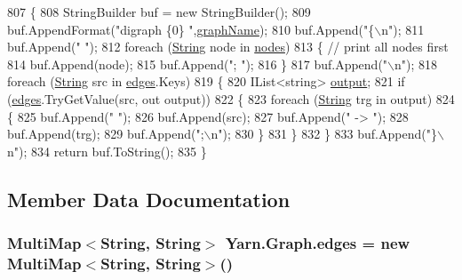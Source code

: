 \begin{DoxyCode}
807         \{
808             StringBuilder buf = \textcolor{keyword}{new} StringBuilder();
809             buf.AppendFormat(\textcolor{stringliteral}{"digraph \{0\} "},\hyperlink{a00102_a8605f1ec5a4e9cfd07d3ac2be042dac6}{graphName});
810             buf.Append(\textcolor{stringliteral}{"\{\(\backslash\)n"});
811             buf.Append(\textcolor{stringliteral}{"  "});
812             \textcolor{keywordflow}{foreach} (\hyperlink{a00045_a301aa7c866593a5b625a8fc158bbeacea27118326006d3829667a400ad23d5d98}{String} node \textcolor{keywordflow}{in} \hyperlink{a00102_a506df6f737a41748c01239bdea5d82b1}{nodes})
813             \{ \textcolor{comment}{// print all nodes first}
814                 buf.Append(node);
815                 buf.Append(\textcolor{stringliteral}{"; "});
816             \}
817             buf.Append(\textcolor{stringliteral}{"\(\backslash\)n"});
818             \textcolor{keywordflow}{foreach} (\hyperlink{a00045_a301aa7c866593a5b625a8fc158bbeacea27118326006d3829667a400ad23d5d98}{String} src \textcolor{keywordflow}{in} \hyperlink{a00102_a8adf7c937ab5c584b49698283e3da150}{edges}.Keys)
819             \{
820                 IList<string> \hyperlink{a00336_a3da6d48778c7b08a040bf24377f67792}{output};
821                 \textcolor{keywordflow}{if} (\hyperlink{a00102_a8adf7c937ab5c584b49698283e3da150}{edges}.TryGetValue(src, out output))
822                 \{
823                     \textcolor{keywordflow}{foreach} (\hyperlink{a00045_a301aa7c866593a5b625a8fc158bbeacea27118326006d3829667a400ad23d5d98}{String} trg \textcolor{keywordflow}{in} output)
824                     \{
825                         buf.Append(\textcolor{stringliteral}{"  "});
826                         buf.Append(src);
827                         buf.Append(\textcolor{stringliteral}{" -> "});
828                         buf.Append(trg);
829                         buf.Append(\textcolor{stringliteral}{";\(\backslash\)n"});
830                     \}
831                 \}
832             \}
833             buf.Append(\textcolor{stringliteral}{"\}\(\backslash\)n"});
834             \textcolor{keywordflow}{return} buf.ToString();
835         \}
\end{DoxyCode}


\subsection{Member Data Documentation}
\hypertarget{a00102_a8adf7c937ab5c584b49698283e3da150}{
\subsubsection[{edges}]{\setlength{\rightskip}{0pt plus 5cm}Multi\-Map$<${\bf String}, {\bf String}$>$ Yarn.\-Graph.\-edges = new Multi\-Map$<${\bf String}, {\bf String}$>$()}}\label{a00102_a8adf7c937ab5c584b49698283e3da150}


